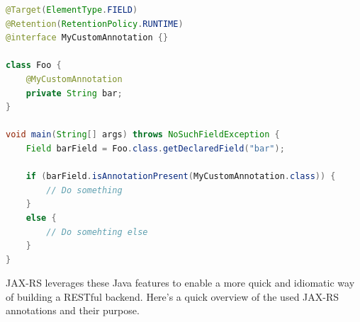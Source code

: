 \begin{lstlisting}[language=Java, caption=Example of a Java Annotation being retrievied via the Reflection API.]
@Target(ElementType.FIELD)
@Retention(RetentionPolicy.RUNTIME)
@interface MyCustomAnnotation {}

class Foo {
    @MyCustomAnnotation
    private String bar;
}

void main(String[] args) throws NoSuchFieldException {
    Field barField = Foo.class.getDeclaredField("bar");

    if (barField.isAnnotationPresent(MyCustomAnnotation.class)) {
        // Do something
    }
    else {
        // Do somehting else
    }
}
\end{lstlisting}

JAX-RS leverages these Java features to enable a more quick and idiomatic way of building a RESTful backend. Here's a quick overview of the used JAX-RS annotations and their purpose.

